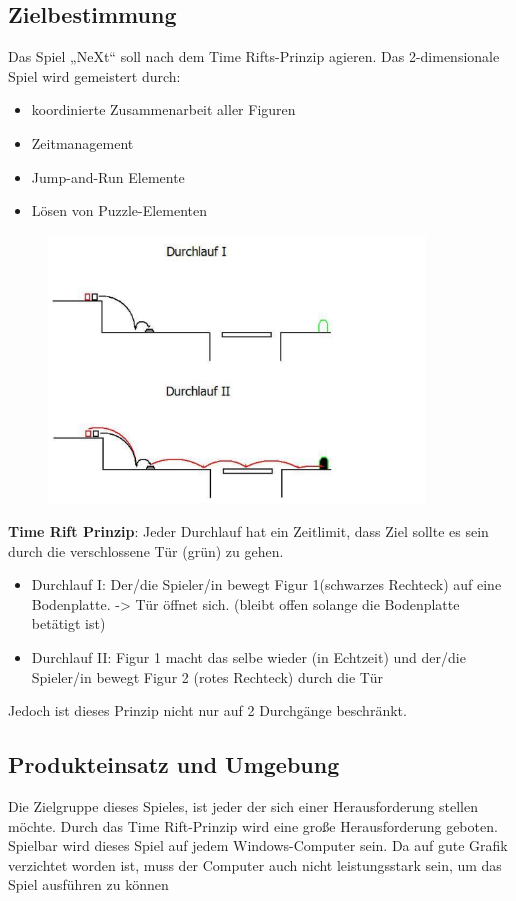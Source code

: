 \subsection{Zielbestimmung}
Das Spiel „NeXt“ soll nach dem Time Rifts-Prinzip agieren. Das 2-dimensionale Spiel wird gemeistert durch:
\begin{itemize}
	\item koordinierte Zusammenarbeit aller Figuren
	\item Zeitmanagement
	\item Jump-and-Run Elemente
	\item Lösen von Puzzle-Elementen
\end{itemize}
\begin{figure}[H]
	\centering
	\includegraphics[width=10cm]{images/TimeRift.png}
\end{figure}
\textbf{Time Rift Prinzip}: Jeder Durchlauf hat ein Zeitlimit, dass Ziel sollte es sein durch die verschlossene Tür (grün) zu gehen.
\begin{itemize}
	\item Durchlauf I: Der/die Spieler/in bewegt Figur 1(schwarzes Rechteck) auf eine Bodenplatte. -> Tür öffnet sich. (bleibt offen solange die Bodenplatte betätigt ist)
	\item Durchlauf II: Figur 1 macht das selbe wieder (in Echtzeit) und der/die Spieler/in bewegt Figur 2 (rotes Rechteck) durch die Tür
\end{itemize}
Jedoch ist dieses Prinzip nicht nur auf 2 Durchgänge beschränkt.
\subsection{Produkteinsatz und Umgebung}
Die Zielgruppe dieses Spieles, ist jeder der sich einer Herausforderung stellen möchte. Durch das Time Rift-Prinzip wird eine große Herausforderung geboten. Spielbar wird dieses Spiel auf jedem Windows-Computer sein. Da auf gute Grafik verzichtet worden ist, muss der Computer auch nicht leistungsstark sein, um das Spiel ausführen zu können 
